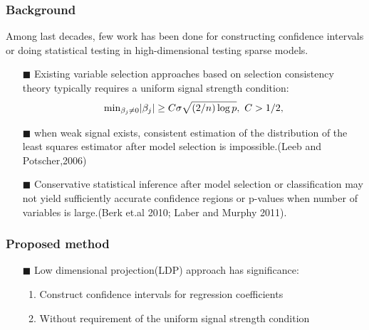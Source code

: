 \begin{frame}
\frametitle{Background}
Among last decades, few work has been done for constructing confidence intervals or doing statistical testing in high-dimensional testing sparse models.
\begin{itemize}
\item[$\blacksquare$] Existing variable selection approaches based on selection consistency theory typically requires a uniform signal strength condition:
    \begin{equation}
    \label{ussc}
    \hbox{$\min_{\beta_j\neq 0}$} |\beta_j| \ge C\sigma\sqrt{(2/n)\log p},\ C>1/2,
    \end{equation}

\item[$\blacksquare$] when weak signal exists, consistent estimation of the distribution
of the least squares estimator after model selection is impossible.(Leeb and Potscher,2006)

\item[$\blacksquare$] Conservative statistical inference after model selection or classification may not yield sufficiently accurate confidence regions or p-values when number of variables is large.(Berk et.al 2010; Laber and Murphy 2011).
\end{itemize}
\end{frame}

\begin{frame}
\frametitle{Proposed method}
\begin{itemize}
\item[$\blacksquare$] Low dimensional projection(LDP) approach has significance:
  \begin{enumerate}[(1)]
  \item Construct confidence intervals for regression coefficients
  \item Without requirement of the uniform signal strength condition
  \end{enumerate}
\end{itemize}
\end{frame}

